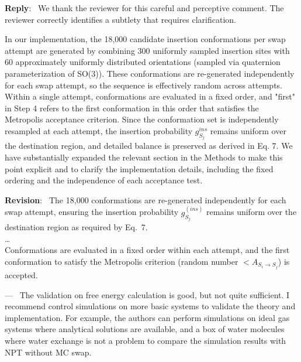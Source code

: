 \documentclass[doublespace,prb,aps]{article}
\newcounter{reviewer}
\newcounter{point}[reviewer]
\renewcommand{\thepoint}{Comment\,\thereviewer.\arabic{point}}
\newenvironment{point}
   {\refstepcounter{point} \bigskip \noindent {\textbf{Reviewer~\thepoint} } ---\ }
   {\par }
\newenvironment{reply}
   {\medskip \noindent \color{black} \begin{sf}\textbf{Reply}:\  }
   {\medskip \par \end{sf}}
\newenvironment{revision}
   {\medskip \noindent \color{blue} \begin{sf}\textbf{Revision}:\textit{\ }}
   {\medskip \par \end{sf}}
\begin{document}
\begin{reply}
We thank the reviewer for this careful and perceptive comment. The reviewer correctly identifies a subtlety that requires clarification.

In our implementation, the 18,000 candidate insertion conformations per swap attempt 
are generated by combining 300 uniformly sampled insertion sites with 60 approximately uniformly distributed orientations (sampled via quaternion parameterization of SO(3)). 
These conformations are re-generated independently for each swap attempt, 
so the sequence is effectively random across attempts. 
Within a single attempt, conformations are evaluated in a fixed order, 
and "first" in Step 4 refers to the first conformation in this order that satisfies the Metropolis acceptance criterion.
Since the conformation set is independently resampled at each attempt, 
the insertion probability $g^{ins}_{S_j}$ remains uniform over the destination region, 
and detailed balance is preserved as derived in Eq. 7.
We have substantially expanded the relevant section in the Methods to make this point explicit and to clarify the implementation details, 
including the fixed ordering and the independence of each acceptance test.
\end{reply}

\begin{revision}
The 18,000 conformations are re-generated independently for each swap attempt, ensuring the insertion probability $g^{(ins)}_{S_j}$ remains uniform over the destination region as required by Eq.~7.\\
\dots \\
Conformations are evaluated in a fixed order within each attempt, and the first conformation to satisfy the Metropolis criterion (random number  $< A_{S_i \to S_j}$) is accepted.
\end{revision}


\begin{point}
The validation on free energy calculation is good, but not quite sufficient. 
I recommend control simulations on more basic systems to validate the theory and implementation. 
For example, the authors can perform simulations on ideal gas systems where analytical solutions are available, 
and a box of water molecules where water exchange is not a problem to compare the simulation results with NPT without MC swap.\label{comment_22}
\end{point}
\end{document}
